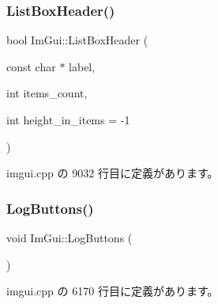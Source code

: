 \subsubsection{\texorpdfstring{List\+Box\+Header()}{ListBoxHeader()}\hspace{0.1cm}{\footnotesize\ttfamily [2/2]}}
{\footnotesize\ttfamily bool Im\+Gui\+::\+List\+Box\+Header (\begin{DoxyParamCaption}\item[{const char $\ast$}]{label,  }\item[{int}]{items\+\_\+count,  }\item[{int}]{height\+\_\+in\+\_\+items = {\ttfamily -\/1} }\end{DoxyParamCaption})}



 imgui.\+cpp の 9032 行目に定義があります。

\mbox{\label{namespace_im_gui_a7bd295da4be19bab98262c76fcaeb4fb}} 
\subsubsection{\texorpdfstring{Log\+Buttons()}{LogButtons()}}
{\footnotesize\ttfamily void Im\+Gui\+::\+Log\+Buttons (\begin{DoxyParamCaption}{ }\end{DoxyParamCaption})}



 imgui.\+cpp の 6170 行目に定義があります。

